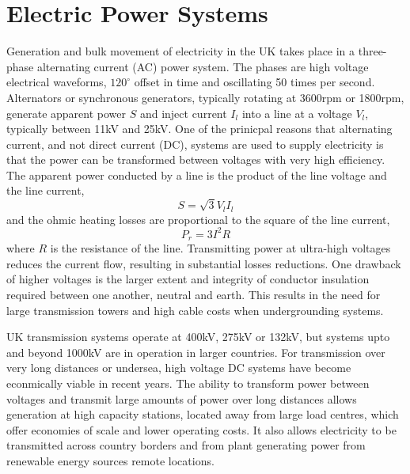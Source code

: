 \section{Electric Power Systems}
Generation and bulk movement of electricity in the UK takes place in a
three-phase alternating current (AC) power system.  The phases are high voltage
electrical waveforms, $120^\circ$ offset in time and oscillating 50 times per
second.  Alternators or synchronous generators, typically rotating at 3600rpm
or 1800rpm, generate apparent power $S$ and inject current $I_l$ into a line at
a voltage $V_l$, typically between 11kV and 25kV.  One of the prinicpal reasons
that alternating current, and not direct current (DC), systems are used to
supply electricity is that the power can be transformed between voltages with
very high efficiency.  The apparent power conducted by a line is the product of
the line voltage and the line current,
\begin{equation}
S = \sqrt{3} V_l I_l
\end{equation}
and the ohmic heating losses are proportional to the square of the line
current,
\begin{equation}
P_{r} = 3 I^2 R
\end{equation}
where $R$ is the resistance of the line.  Transmitting power at ultra-high
voltages reduces the current flow, resulting in substantial losses reductions.
One drawback of higher voltages is the larger extent and integrity of conductor
insulation required between one another, neutral and earth.  This results in
the need for large transmission towers and high cable costs when undergrounding
systems.

UK transmission systems operate at 400kV, 275kV or 132kV, but systems upto
and beyond 1000kV are in operation in larger countries.  For transmission over
very long distances or undersea, high voltage DC systems have become
econmically viable in recent years.  The ability to transform power between
voltages and transmit large amounts of power over long distances allows
generation at high capacity stations, located away from large load centres,
which offer economies of scale and lower operating costs.  It also allows
electricity to be transmitted across country borders and from plant generating
power from renewable energy sources remote locations.

